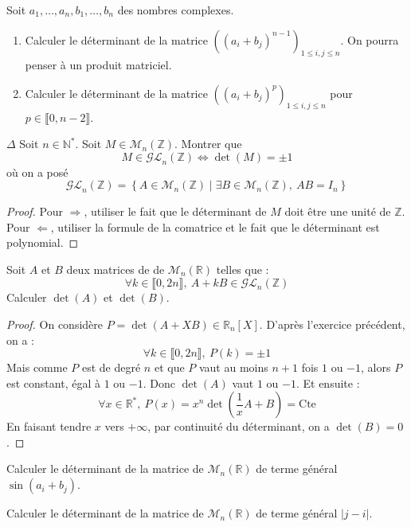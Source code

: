 \documentclass[french,a4paper]{article}
\newcommand{\N}{\mathbb{N}}
\newcommand{\Z}{\mathbb{Z}}
\newcommand{\R}{\mathbb{R}}
\newcommand{\st}{^*}
\theoremstyle{plain}
\theoremstyle{definition}
\theoremstyle{remark}
\begin{document}
\begin{ex}{}
	Soit $a_1,\ldots,a_n,b_1,\ldots,b_n$ des nombres complexes.
	\begin{enumerate}
		\item Calculer le déterminant de la matrice $((a_i+b_j)^{n-1})_{1\leqslant i,j\leqslant n}$. On pourra penser à un produit matriciel.
		\item Calculer le déterminant de la matrice $((a_i+b_j)^{p})_{1\leqslant i,j\leqslant n}$ pour $p\in\llbracket 0,n-2\rrbracket$.
	\end{enumerate}
\end{ex}

\begin{ex}{$\Delta$}
	Soit $n \in \N\st$.
	Soit $M \in \mathcal{M}_n(\Z)$. Montrer que $$ M \in \mathcal{GL}_n(\Z) \Longleftrightarrow \det(M)=\pm 1 $$ où on a posé $$\mathcal{GL}_n(\Z)=\left\{A \in \mathcal{M}_n(\Z) \mid \exists B \in \mathcal{M}_n(\Z), \ AB=I_n\right\}$$
\end{ex}
\begin{proof}
	Pour $\Longrightarrow$, utiliser le fait que le déterminant de $M$ doit être une unité de $\Z$. Pour $\Longleftarrow$, utiliser la formule de la comatrice et le fait que le déterminant est polynomial.
\end{proof}

\begin{ex}[]{}
	Soit $A$ et $B$ deux matrices de de $\mathcal{M}_n(\R)$ telles que : $$\forall k\in\llbracket0,2n\rrbracket,\ A+kB\in\mathcal{GL}_n(\Z)$$ Calculer $\det(A)$ et $\det(B)$.
\end{ex}
\begin{proof}
	On considère $P=\det(A+XB)\in\R_n[X]$. D'après l'exercice précédent, on a : $$\forall k\in\llbracket0,2n\rrbracket,\ P(k)=\pm1$$ Mais comme $P$ est de degré $n$ et que $P$ vaut au moins $n+1$ fois $1$ ou $-1$, alors $P$ est constant, égal à $1$ ou $-1$. Donc $\det(A)$ vaut $1$ ou $-1$. Et ensuite : $$\forall x\in\R\st,\ P(x)=x^n\det\left(\frac{1}{x}A+B\right)=\text{Cte}$$ En faisant tendre $x$ vers $+\infty$, par continuité du déterminant, on a $\det(B)=0$.
\end{proof}

\begin{ex}{}
	Calculer le déterminant de la matrice de $\mathcal{M}_n(\R)$ de terme général $\sin(a_i+b_j)$.
\end{ex}

\begin{ex}{}
	Calculer le déterminant de la matrice de $\mathcal{M}_n(\R)$ de terme général $\lvert j-i\rvert$.
\end{ex}
\end{document}
